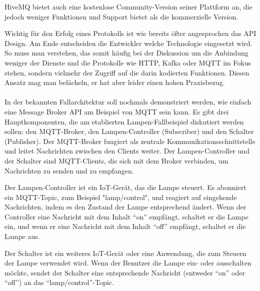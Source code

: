 \documentclass[../vs-script-first-v01.tex]{subfiles}
\begin{document}
HiveMQ bietet auch eine kostenlose Community-Version seiner Plattform an, die jedoch weniger Funktionen und Support bietet als die kommerzielle Version. 

Wichtig für den Erfolg eines Protokolls ist wie bereits öfter angesprochen das API Design. Am Ende entscheiden die Entwickler welche Technologie eingesetzt wird. So muss man verstehen, das somit häufig bei der Diskussion um die Anbindung weniger der Dienste und  die Protokolle wie HTTP, Kafka oder MQTT im Fokus stehen, sondern vielmehr der Zugriff auf die darin kodierten Funktionen. Diesen Ansatz mag man belächeln, er hat aber leider einen hohen Praxisbezug.  
\\\\
In der bekannten Fallarchitektur soll nochmals demonstriert werden, wie einfach eine Message Broker API am Beispiel von MQTT sein kann. Es gibt drei Hauptkomponenten, die am etablierten Lampen-Fallbeispiel diskutiert werden sollen: den MQTT-Broker, den Lampen-Controller (Subscriber) und den Schalter (Publisher). Der MQTT-Broker fungiert als zentrale Kommunikationsschnittstelle und leitet Nachrichten zwischen den Clients weiter. Der Lampen-Controller und der Schalter sind MQTT-Clients, die sich mit dem Broker verbinden, um Nachrichten zu senden und zu empfangen.

Der Lampen-Controller ist ein IoT-Gerät, das die Lampe steuert. Es abonniert ein MQTT-Topic, zum Beispiel "lamp/control", und reagiert auf eingehende Nachrichten, indem es den Zustand der Lampe entsprechend ändert. Wenn der Controller eine Nachricht mit dem Inhalt \enquote{on} empfängt, schaltet er die Lampe ein, und wenn er eine Nachricht mit dem Inhalt \enquote{off} empfängt, schaltet er die Lampe aus.

Der Schalter ist ein weiteres IoT-Gerät oder eine Anwendung, die zum Steuern der Lampe verwendet wird. Wenn der Benutzer die Lampe ein- oder ausschalten möchte, sendet der Schalter eine entsprechende Nachricht (entweder \enquote{on} oder \enquote{off}) an das \enquote{lamp/control}-Topic.
\end{document}
